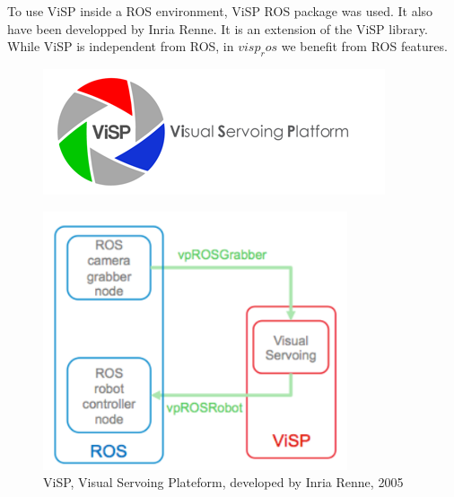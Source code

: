 \begin{itemize}
To use ViSP inside a ROS environment, ViSP ROS package was used. It also have been developped by Inria Renne. It is an extension of the ViSP library. While ViSP is independent from ROS, in $visp_ros$ we benefit from ROS features.
\begin{figure} [!h]
    \begin{minipage}[b]{0.5\linewidth}
        \begin{center}
            \includegraphics[width=1\linewidth]{images/bandeauViSP.png}
        \end{center}

        \label{pict:visp_logo}
    \end{minipage}
    \begin{minipage}[b]{0.5\linewidth}
      \begin{center}
        \includegraphics[width=0.8\textwidth]{images/visp_ros.png}
      \end{center}
    \end{minipage}
    \caption  {ViSP, Visual Servoing Plateform, developed by Inria Renne, 2005}
\end{figure}


\end{itemize}
